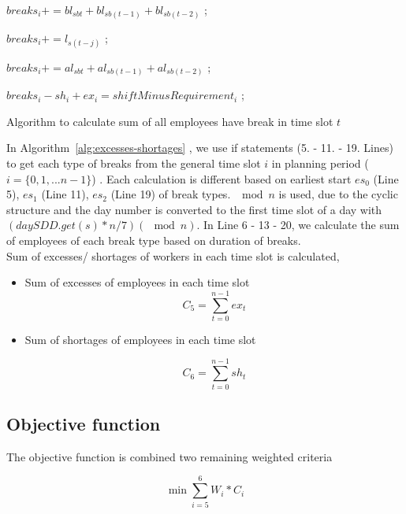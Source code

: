 \begin{algorithm}
  {
     {
        {
           {
              {
		 $breaks_i += bl_{sbt} + bl_{sb(t-1)} + bl_{sb(t-2)}$  ;
              }
           }
        }

        {
           {
              {
		 $breaks_i += l_{s(t-j)}$  ;
              }
           }
        }

        {
           {
              {
		 $breaks_i += al_{sbt} + al_{sb(t-1)} + al_{sb(t-2)}$  ;
              }
           }
        }
   }
   $breaks_i - sh_i + ex_i = shiftMinusRequirement_i$ ;
}
  \caption{Algorithm to calculate sum of all employees have break in time slot $t$}
  \label{alg:excesses-shortages} 
\end{algorithm}

In Algorithm~\ref{alg:excesses-shortages} , we use if statements (5. - 11. - 19. Lines) to get each type of breaks from the general time slot $i$ in planning period ($i = \{0,1,... n-1\}$) . Each calculation is different based on earliest start $es_0$ (Line 5), $es_1$  (Line 11), $es_2$ (Line 19) of break types. $\mod n$ is used, due to the cyclic structure and the day number is converted to the first time slot of a day with $(daySDD.get(s) * n / 7) (\mod n)$. In Line 6 - 13 - 20, we calculate the sum of employees of each break type based on duration of breaks. \\

Sum of excesses/ shortages of workers in each time slot is calculated,

\begin{itemize}
\item Sum of excesses of employees in each time slot 
\begin{equation}
C_5 = \sum_{t=0}^{n-1} ex_t
\end{equation}
\item Sum of shortages of employees in each time slot

\begin{equation}
C_6 = \sum_{t=0}^{n-1} sh_t
\end{equation}
\end{itemize}



\subsection{Objective function}
The objective function is combined two remaining weighted criteria

\begin{equation}
\min \sum_{i=5}^6 W_i * C_i
\end{equation}


